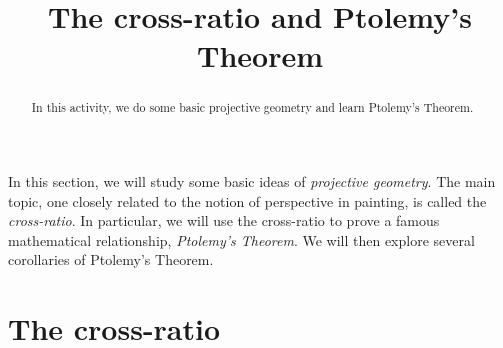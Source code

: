 \documentclass{ximera}
\title{The cross-ratio and Ptolemy's Theorem}
\begin{document}
\begin{abstract}
In this activity, we do some basic projective geometry and learn
Ptolemy's Theorem.
\end{abstract}
\maketitle

In this section, we will study some basic ideas of \textit{projective
  geometry}. The main topic, one closely related to the notion of
perspective in painting, is called the \textit{cross-ratio}.  In
particular, we will use the cross-ratio to prove a famous mathematical
relationship, \textit{Ptolemy's Theorem}. We will then explore several
corollaries of Ptolemy's Theorem.



\section{The cross-ratio}
\end{document}
